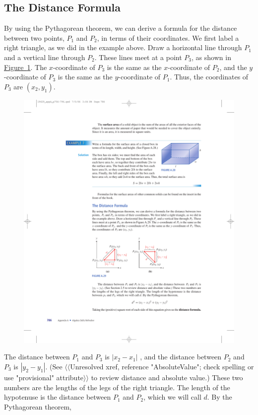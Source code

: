 \documentclass[10pt,]{book}
\theoremstyle{plain}
\theoremstyle{definition}
\theoremstyle{definition}
\theoremstyle{definition}
\numberwithin{equation}{part}
\newcommand\abs[1]{\left|#1\right|}
\begin{document}
\subsection[{The Distance Formula}]{The Distance Formula}\label{subsection-56}
By using the Pythagorean theorem, we can derive a formula for the distance between two points, \(P_1\) and \(P_2\), in terms of their coordinates. We first label a right triangle, as we did in the example above. Draw a horizontal line through \(P_1\) and a vertical line through \(P_2\). These lines meet at a point \(P_3\), as shown in \hyperref[fig-distance-formula]{Figure~\ref{fig-distance-formula}}. The \(x\)-coordinate of \(P_3\) is the same as the \(x\)-coordinate of \(P_2\), and the \(y\)-coordinate of \(P_3\) is the same as the \(y\)-coordinate of \(P_1\). Thus, the coordinates of \(P_3\) are \((x_2, y_1)\). \leavevmode%
\begin{figure}
\centering
\includegraphics[width=0.75\linewidth]{images/fig-distance-formula}
\caption{\label{fig-distance-formula}}
\end{figure}
%
\par
The distance between \(P_1\) and \(P_3\) is \(\abs{x_2-x_1}\) , and the distance between \(P_2\) and \(P_3\) is \(\abs{y_2-y_1} \). (See {$\langle\langle$Unresolved xref, reference "AbsoluteValue"; check spelling or use "provisional" attribute$\rangle\rangle$} to review distance and absolute value.) These two numbers are the lengths of the legs of the right triangle. The length of the hypotenuse is the distance between \(P_1\) and \(P_2\), which we will call \(d\). By the Pythagorean theorem,%
\end{document}
